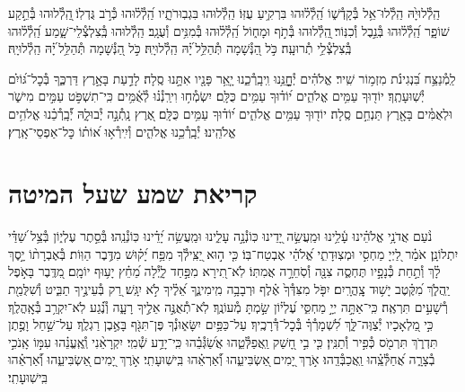 \documentclass[twoside, openany, parskip=half, 11pt]{book}
\begin{document}
הַֽלְ֯לוּיָ֙הּ הַֽלְ֯לוּ־אֵ֥ל בְּ֯קָדְ֯שׁ֑וֹ הַֽ֝לְ֯ל֗וּהוּ בִּרְקִ֥יעַ עֻזּֽוֹ׃
הַֽלְ֯לוּהוּ בִּגְבֽוּרֹתָ֑יו הַֽ֝לְ֯ל֗וּהוּ כְּ֯רֹ֣ב גֻּדְלֽוֹ׃
֖הַֽלְ֯לוּהוּ בְּ֯תֵ֣קַע שׁוֹפָ֑ר הַֽ֝לְ֯ל֗וּהוּ בְּ֯נֵ֣בֶל וְ֯כִנּֽוֹר׃
֖הַֽלְ֯לוּהוּ בְּ֯תֹ֣ף וּמָח֑וֹל הַֽ֝לְ֯ל֗וּהוּ בְּ֯מִנִּ֥ים וְ֯עֻגָֽב׃
הַֽלְ֯לוּהוּ בְּֽ֯צִלְצְ֯לֵי־שָׁ֑מַע הַֽ֝לְ֯ל֗וּהוּ בְּֽ֯צִלְצְ֯לֵ֥י תְ֯רוּעָֽה׃
כֹּ֣ל הַ֭נְּ֯שָׁמָה תְּ֯הַלֵּ֥ל ֝יָ֗הּ הַֽלְ֯לוּיָֽהּ׃
כֹּ֣ל הַ֭נְּ֯שָׁמָה תְּ֯הַלֵּ֥ל ֝יָ֗הּ הַֽלְ֯לוּיָֽהּ׃

\enlargethispage{\baselineskip}
לַֽמְ֯נַצֵּ֥ח
בִּ֝נְגִינֹ֗ת מִזְמ֥וֹר שִֽׁיר׃ אֱלֹהִ֗ים יְ֯חׇׇׇׇׇנֵּ֥נוּ וִֽיבָֽרְ֯כֵ֑נוּ יָ֤אֵ֥ר פָּנָ֖יו אִתָּ֣נוּ סֶֽלָה׃ לָדַ֣עַת בָּאָ֣רֶץ דַּרְכֶּ֑ךָ בְּ֯כׇל־גּ֝וֹיִ֗ם יְ֯שֽׁוּעָתֶֽךָ׃ יוֹד֖וּךָ עַמִּ֥ים אֱלֹהִ֑ים י֝וֹד֗וּךָ עַמִּ֥ים כֻּלָּֽם׃ יִשְׂמְ֯ח֥וּ וִירַֽנְ֯נ֗וּ לְ֯אֻ֫מִּ֥ים כִּֽי־תִשְׁפֹּ֣ט עַמִּ֣ים מִישֹׁ֑ר וּלְאֻמִּ֓ים בָּאָ֖רֶץ תַּנְחֵ֣ם סֶֽלָה׃ יוֹד֖וּךָ עַמִּ֥ים אֱלֹהִ֑ים י֝וֹד֗וּךָ עַמִּ֥ים כֻּלָּֽם׃ אֶ֭רֶץ נָֽתְ֯נָ֣ה יְ֯בוּלָ֑הּ יְ֝֯בָֽרְ֯כֵ֗נוּ אֱלֹהִ֥ים אֱלֹהֵֽינוּ׃ יְ֯בָֽרְ֯כֵ֥נוּ אֱלֹהִ֑ים וְ֯יִֽירְ֯א֥וּ א֝וֹת֗וֹ כׇּל־אַפְסֵי־אָֽרֶץ׃


\chapter[קריאת שמע שעל המיטה]{ קריאת שמע שעל המיטה }

\shema

\veahavta

נֹ֨עַם אֲדֹנָ֥י אֱלֹהֵ֗ינוּ עָ֫לֵ֥ינוּ וּמַֽעֲשֵׂ֣ה יָ֭דֵינוּ כּֽוֹנְ֯נָ֣ה עָלֵ֑ינוּ וּמַֽעֲשֵׂ֥ה יָ֝דֵ֗ינוּ כּֽוֹנְ֯נֵֽהוּ׃
בְּ֯סֵ֣תֶר עֶלְי֑וֹן בְּ֯צֵ֥ל שַׁ֝דַּ֗י יִתְלוֹנָֽן׃
אֹמַ֗ר לַ֭יְיָ מַחְסִ֣י וּמְצֽוּדָתִ֑י אֱ֝לֹהַ֗י אֶבְטַח־בּֽוֹ׃
כִּ֤י ה֣וּא יַ֭צִּֽילְ֯ךָ מִפַּ֥ח יָ֝ק֗וּשׁ מִדֶּ֥בֶר הַוּֽוֹת׃
בְּ֯אֶבְרָת֨וֹ יָ֣סֶךְ לָ֗ךְ וְ֯תַ֣חַת כְּ֯נָפָ֣יו תֶּחְסֶ֑ה צִנָּ֖ה וְ֯סֹֽחֵרָ֣ה אֲמִתּֽוֹ׃
לֹֽא־תִ֭ירָא מִפַּ֣חַד לָ֑יְ֯לָה מֵ֝חֵ֗ץ יָע֥וּף יוֹמָֽם׃
מִ֭דֶּֽבֶר בָּאֹ֣פֶל יַֽהֲלֹ֑ךְ מִ֝קֶּ֗טֶב יָשׁ֥וּד צׇֽהֳרָֽיִם׃
יִפֹּ֤ל מִצִּדְּ֯ךָ֙ אֶ֗לֶף וּרְבָבָ֥ה מִֽימִינֶ֑ךָ אֵ֝לֶ֗יךָ לֹ֣א יִגָּֽשׁ׃
רַ֭ק בְּ֯עֵינֶ֣יךָ תַבִּ֑יט וְ֯שִׁלֻּמַ֖ת רְ֯שָׁעִ֣ים תִּרְאֶֽה׃
כִּֽי־אַתָּ֣ה יְיָ֣ מַחְסִּ֑י עֶ֝לְי֗וֹן שַׂ֣מְתָּ מְ֯עוֹנֶֽךָ׃
לֹֽא־תְ֯אֻנֶּ֣ה אֵלֶ֣יךָ רָעָ֑ה וְ֯נֶ֗֝גַע לֹֽא־יִקְרַ֥ב בְּ֯אׇֽהֳלֶֽךָ׃
כִּ֣י מַ֭לְאָכָיו יְ֯צַוֶּה־לָּ֑ךְ לִ֝שְׁמָרְ֯ךָ֗ בְּ֯כׇל־דְּ֯רָכֶֽיךָ׃
עַל־כַּפַּ֥יִם יִשָּׂא֑וּנְ֯ךָ פֶּן־תִּגֹּ֖ף בָּאֶ֣בֶן רַגְלֶֽךָ׃
עַל־שַׁ֣חַל וָפֶ֣תֶן תִּדְרֹ֑ךְ תִּרְמֹ֖ס כְּ֯פִ֣יר וְ֯תַנִּֽין׃
כִּ֤י בִ֣י חָ֭שַׁק וַֽאֲפַלְּ֯טֵ֑הוּ אֲשַׂ֝גְּ֯בֵ֗הוּ כִּֽי־יָדַ֥ע שְׁ֯מִֽי׃
יִקְרָאֵ֨נִי וְֽ֯אֶֽעֱנֵ֗הוּ עִמּ֣וֹ אָֽנֹכִ֣י בְ֯צָרָ֑ה אֲ֝חַלְּ֯צֵֽ֗הוּ וַֽאֲכַבְּ֯דֵֽהוּ׃
אֹ֣רֶךְ יָ֭מִים ֖אַשְׂבִּיעֵ֑הוּ וְ֝֯אַרְאֵ֗הוּ בִּֽישֽׁוּעָתִֽי׃
אֹ֣רֶךְ יָ֭מִים ֖אַשְׂבִּיעֵ֑הוּ וְ֝֯אַרְאֵ֗הוּ בִּֽישֽׁוּעָתִֽי׃
\end{document}
